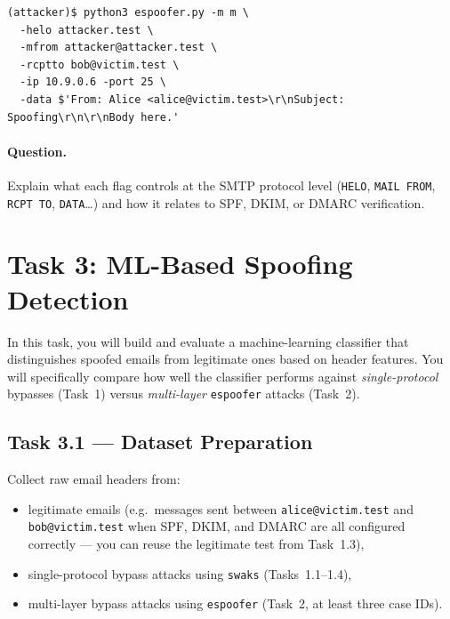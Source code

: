 \documentclass[11pt]{article}
\begin{document}
\begin{listing}[H]
\begin{verbatim}
(attacker)$ python3 espoofer.py -m m \
  -helo attacker.test \
  -mfrom attacker@attacker.test \
  -rcptto bob@victim.test \
  -ip 10.9.0.6 -port 25 \
  -data $'From: Alice <alice@victim.test>\r\nSubject: Spoofing\r\n\r\nBody here.'
\end{verbatim}
\end{listing}

\paragraph{Question.}
Explain what each flag controls at the SMTP protocol level
(\texttt{HELO}, \texttt{MAIL FROM}, \texttt{RCPT TO},
\texttt{DATA}\ldots) and how it relates to SPF, DKIM, or DMARC
verification.

\section{Task 3: ML-Based Spoofing Detection}

In this task, you will build and evaluate a machine-learning classifier
that distinguishes spoofed emails from legitimate ones based on header
features.
You will specifically compare how well the classifier performs against
\emph{single-protocol} bypasses (Task~1) versus \emph{multi-layer}
\texttt{espoofer} attacks (Task~2).

\subsection{Task 3.1 --- Dataset Preparation}

Collect raw email headers from:
\begin{itemize}[noitemsep]
  \item legitimate emails (e.g.\ messages sent between
        \texttt{alice@victim.test} and \texttt{bob@victim.test} when
        SPF, DKIM, and DMARC are all configured correctly --- you can
        reuse the legitimate test from Task~1.3),
  \item single-protocol bypass attacks using \texttt{swaks}
        (Tasks~1.1--1.4),
  \item multi-layer bypass attacks using \texttt{espoofer} (Task~2,
        at least three case IDs).
\end{itemize}
\end{document}
